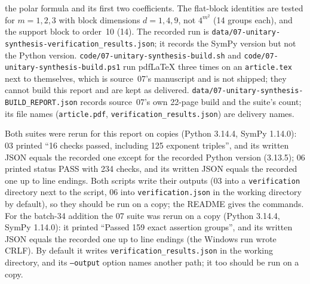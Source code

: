 \documentclass[11pt,letterpaper]{article}
\numberwithin{equation}{section}
\theoremstyle{definition}
\theoremstyle{remark}
\newcommand{\fn}[1]{\nolinkurl{#1}}
\begin{document}
\begin{itemize}[leftmargin=*]
the polar formula and its first two coefficients. The flat-block identities
are tested for $m=1,2,3$ with block dimensions $d=1,4,9$, not $4^{m^2}$ (14
groups each), and the support block to order~10 (14). The recorded run is
\fn{data/07-unitary-synthesis-verification_results.json}; it records the SymPy
version but not the Python version.
\fn{code/07-unitary-synthesis-build.sh} and
\fn{code/07-unitary-synthesis-build.ps1} run pdfLaTeX three times on an
\fn{article.tex} next to themselves, which is source~07's manuscript and is
not shipped; they cannot build this report and are kept as delivered.
\fn{data/07-unitary-synthesis-BUILD_REPORT.json} records source~07's own
22-page build and the suite's count; its file names (\fn{article.pdf},
\fn{verification_results.json}) are delivery names.
\end{itemize}
Both suites were rerun for this report on copies (Python 3.14.4, SymPy
1.14.0): 03 printed ``16 checks passed, including 125 exponent triples'', and
its written JSON equals the recorded one except for the recorded Python
version (3.13.5); 06 printed status PASS with 234 checks, and its written JSON
equals the recorded one up to line endings. Both scripts write their outputs
(03 into a \fn{verification} directory next to the script, 06 into
\fn{verification.json} in the working directory by default), so they should
be run on a copy; the README gives the commands. For the batch-34 addition
the 07 suite was rerun on a copy (Python 3.14.4, SymPy 1.14.0): it printed
``Passed 159 exact assertion groups'', and its written JSON equals the
recorded one up to line endings (the Windows run wrote CRLF). By default it
writes \fn{verification_results.json} in the working directory, and its
\texttt{--output} option names another path; it too should be run on a copy.
\end{document}
